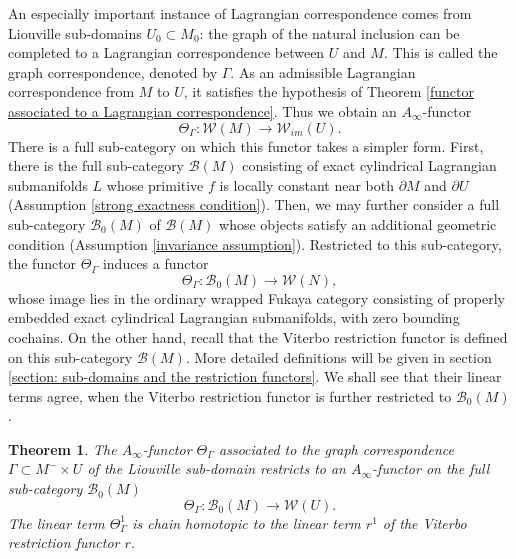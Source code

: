 \documentclass{amsart}
\newtheorem{theorem}{Theorem}[section]
\numberwithin{equation}{section}
\numberwithin{figure}{section}
\begin{document}
	An especially important instance of Lagrangian correspondence comes from Liouville sub-domains $U_{0} \subset M_{0}$: the graph of the natural inclusion can be completed to a Lagrangian correspondence between $U$ and $M$. This is called the graph correspondence, denoted by $\Gamma$. As an admissible Lagrangian correspondence from $M$ to $U$, it satisfies the hypothesis of Theorem \ref{functor associated to a Lagrangian correspondence}.
Thus we obtain an $A_{\infty}$-functor 
\begin{equation}
\Theta_{\Gamma}: \mathcal{W}(M) \to \mathcal{W}_{im}(U).
\end{equation}
There is a full sub-category on which this functor takes a simpler form.
First, there is the full sub-category $\mathcal{B}(M)$ consisting of exact cylindrical Lagrangian submanifolds $L$ whose primitive $f$ is locally constant near both $\partial M$ and $\partial U$ (Assumption \ref{strong exactness condition}). Then, we may further consider a full sub-category $\mathcal{B}_{0}(M)$ of $\mathcal{B}(M)$ whose objects satisfy an additional geometric condition (Assumption \ref{invariance assumption}). Restricted to this sub-category, the functor $\Theta_{\Gamma}$ induces a functor
\begin{equation*}
\Theta_{\Gamma}: \mathcal{B}_{0}(M) \to \mathcal{W}(N),
\end{equation*}
whose image lies in the ordinary wrapped Fukaya category consisting of properly embedded exact cylindrical Lagrangian submanifolds, with zero bounding cochains. On the other hand, recall that the Viterbo restriction functor is defined on this sub-category $\mathcal{B}(M)$. More detailed definitions will be given in section \ref{section: sub-domains and the restriction functors}. We shall see that their linear terms agree, when the Viterbo restriction functor is further restricted to $\mathcal{B}_{0}(M)$. \par

\begin{theorem}\label{Viterbo functor as a correspondence functor}
	The $A_{\infty}$-functor $\Theta_{\Gamma}$ associated to the graph correspondence $\Gamma \subset M^{-} \times U$ of the Liouville sub-domain restricts to an $A_{\infty}$-functor on the full sub-category $\mathcal{B}_{0}(M)$
\begin{equation}
\Theta_{\Gamma}: \mathcal{B}_{0}(M) \to \mathcal{W}(U).
\end{equation}
The linear term $\Theta_{\Gamma}^{1}$ is chain homotopic to the linear term $r^{1}$ of the Viterbo restriction functor $r$. \par
\end{theorem}
\end{document}
